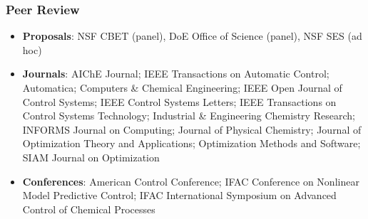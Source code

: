 \documentclass[letterpaper, 11pt]{article}
\begin{document}
\subsubsection*{Peer Review}
\begin{itemize}[leftmargin=*]
\item[] {\bf Proposals}: NSF CBET (panel), DoE Office of Science (panel), NSF SES (ad hoc)
\item[] {\bf Journals}: AIChE Journal; IEEE Transactions on Automatic Control; Automatica; Computers \& Chemical Engineering; IEEE Open Journal of Control Systems; IEEE Control Systems Letters; IEEE Transactions on Control Systems Technology; Industrial \& Engineering Chemistry Research; INFORMS Journal on Computing; Journal of Physical Chemistry; Journal of Optimization Theory and Applications; Optimization Methods and Software; SIAM Journal on Optimization
\item[] {\bf Conferences}: American Control Conference; IFAC Conference on Nonlinear Model Predictive Control; IFAC International Symposium on Advanced Control of Chemical Processes 
\end{itemize}  

\end{document}
